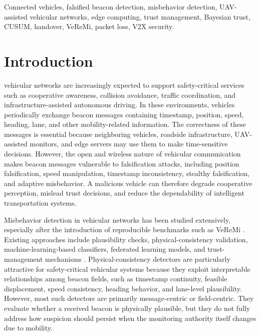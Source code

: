 \documentclass[journal]{IEEEtran}
\begin{document}
\begin{IEEEkeywords}
Connected vehicles, falsified beacon detection, misbehavior detection, UAV-assisted vehicular networks, edge computing, trust management, Bayesian trust, CUSUM, handover, VeReMi, packet loss, V2X security.
\end{IEEEkeywords}






%
\IEEEpeerreviewmaketitle



\section{Introduction}
 vehicular networks are increasingly expected to support safety-critical services such as cooperative awareness, collision avoidance, traffic coordination, and infrastructure-assisted autonomous driving. In these environments, vehicles periodically exchange beacon messages containing timestamp, position, speed, heading, lane, and other mobility-related information. The correctness of these messages is essential because neighboring vehicles, roadside infrastructure, UAV-assisted monitors, and edge servers may use them to make time-sensitive decisions. However, the open and wireless nature of vehicular communication makes beacon messages vulnerable to falsification attacks, including position falsification, speed manipulation, timestamp inconsistency, stealthy falsification, and adaptive misbehavior. A malicious vehicle can therefore degrade cooperative perception, mislead trust decisions, and reduce the dependability of intelligent transportation systems.

Misbehavior detection in vehicular networks has been studied extensively, especially after the introduction of reproducible benchmarks such as VeReMi \cite{veremi}. Existing approaches include plausibility checks, physical-consistency validation, machine-learning-based classifiers, federated learning models, and trust-management mechanisms \cite{andradeSalazar2022VCADS,ilango2022NPFADS,campos2024FLMisbehavior,siddiqui2021SurveyTrustIoV}. Physical-consistency detectors are particularly attractive for safety-critical vehicular systems because they exploit interpretable relationships among beacon fields, such as timestamp continuity, feasible displacement, speed consistency, heading behavior, and lane-level plausibility. However, most such detectors are primarily message-centric or field-centric. They evaluate whether a received beacon is physically plausible, but they do not fully address how suspicion should persist when the monitoring authority itself changes due to mobility.
\end{document}
